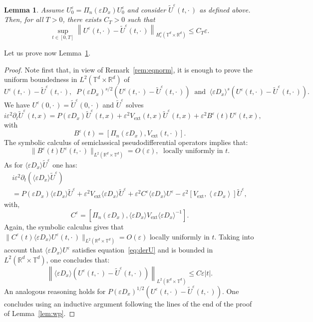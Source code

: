 \documentclass[10pt]{amsart}
\newtheorem{lemm}[cdrthm]{Lemma}
\theoremstyle{definition}
\DeclareMathOperator{\ext}{ext}
\newcommand*\R{{\mathbb R}}
\newcommand*\T{{\mathbb T}}
\newcommand*\eps{\varepsilon}
\numberwithin{equation}{section}
\begin{document}
\begin{lemm}\label{lem:Uadiab}
Assume $U^\eps_0= \Pi_n(\eps D_x) U^\eps_0$ and consider $\widetilde U^\eps(t,\cdot\,)$ as defined above. Then, for all $T>0$, there exists $C_{T}>0$ such that
\[
\sup_{t\in[0,T]} \left\| U^\eps(t,\cdot\,) -\widetilde U^\eps(t,\cdot\,) \right\|_{H^s_\eps(\T^d \times \R^d)} \leq C_{T}\eps.
\]
\end{lemm}


Let us prove now Lemma~\ref{lem:Uadiab}.



\begin{proof}
Note first that, in view of Remark~\ref{rem:eqnorm}, it is enough to prove the uniform boundedness in $L^2(\T^d\times\R^d)$ of
\[
U^\eps(t,\cdot\,) -\widetilde U^\eps(t,\cdot\,),\;\;
P(\eps D_x)^{s/2}(U^\eps(t,\cdot\,) -\widetilde U^\eps(t,\cdot\,))\;\;\text{and}\;\;
\langle \eps D_x\rangle ^s(U^\eps(t,\cdot\,) -\widetilde U^\eps(t,\cdot\,)).
\]
We have $U^\eps(0,\cdot\,)=\widetilde U^\eps(0,\cdot\,)$ and $\widetilde U^\eps$ solves
\begin{equation}\label{eq:Utilde}
i\eps^2\partial_t \widetilde U^\eps(t,x)=P(\eps D_x) \widetilde U^\eps (t,x)+ \eps^2 V_{\ext}(t,x)\widetilde U^\eps (t,x)+ \eps^2 B^\eps (t)U^\eps(t,x),
\end{equation}
with
\[
B^\eps(t) =[\Pi_n(\eps D_x), V_{\ext}(t,\cdot\,)].
\]
The symbolic calculus of semiclassical pseudodifferential operators implies that:
\[
\|B^\eps(t) U^\eps(t,\cdot\,)\|_{L^2(\R^d\times\T^d)}=O(\eps), \;\text{ locally uniformly in }t.
\]
As for $\langle \eps D_x\rangle \widetilde U^\eps$ one has:
\begin{multline*}
i\eps^2\partial_t (\langle \eps D_x\rangle\widetilde U^\eps)\\=P(\eps D_x) \langle \eps D_x\rangle\widetilde U^\eps + \eps^2 V_{\ext} \langle \eps D_x\rangle \widetilde U^\eps + \eps^2C^\eps\langle \eps D_x\rangle U^\eps- \eps^2[V_{\ext}, \left\langle\eps D_x\right\rangle] \widetilde U^\eps,
\end{multline*}
with,
\[
C^\eps=\left[\Pi_n(\eps D_x), \langle \eps D_x\rangle V_{\ext}\langle \eps D_x\rangle^{-1}\right].
\]
Again, the symbolic calculus gives that $\|C^\eps(t)\langle \eps D_x\rangle U^\eps(t,\cdot\,)\|_{L^2(\R^d\times\T^d)}=O(\eps)$ locally uniformly in $t$. Taking into account that $\langle \eps D_x\rangle U^\eps$ satisfies equation~\eqref{eq:derU} and is bounded in $L^2(\R^d\times\T^d)$, one concludes that:
\[
\left\|\langle \eps D_x\rangle \left(U^\eps(t,\cdot\,) -\widetilde U^\eps(t,\cdot\,)\right)\right\|_{L^2(\R^d\times \T^d)}\leq C\eps|t|.
\]
An analogous reasoning holds for $P(\eps D_x)^{1/2}(U^\eps(t,\cdot\,) -\widetilde U^\eps(t,\cdot\,))$. One concludes using an inductive argument following the lines of the end of the proof of Lemma~\ref{lem:wp}.
\end{proof}
\end{document}
